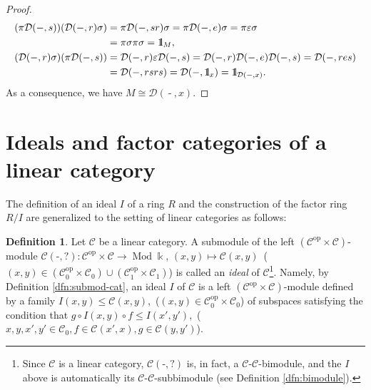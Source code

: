 \documentclass{surv-l}
\numberwithin{equation}{chapter}
\numberwithin{figure}{chapter}
\theoremstyle{plain}
\theoremstyle{definition}
\newtheorem{dfn}[thm]{Definition}
\theoremstyle{remark}
\newcommand{\id}{1\kern-.25em{\text{{\rm l}}}}
\DeclareMathOperator{\Mod}{Mod}
\DeclareMathOperator{\blank}{-}
\begin{document}
\begin{proof}
\[
\begin{aligned}
(\pi {\mathcal{D}}(\blank,s))({\mathcal{D}}(\blank, r) \sigma) &= \pi {\mathcal{D}}(\blank, sr) \sigma
= \pi {\mathcal{D}}(\blank, e) \sigma =\pi \varepsilon \sigma\\
&= \pi \sigma \pi \sigma = \id_M,\\
({\mathcal{D}}(\blank, r) \sigma)(\pi {\mathcal{D}}(\blank,s)) &= {\mathcal{D}}(\blank, r) \varepsilon {\mathcal{D}}(\blank,s)
= {\mathcal{D}}(\blank, r) {\mathcal{D}}(\blank, e) {\mathcal{D}}(\blank,s) = {\mathcal{D}}(\blank, res)\\
&={\mathcal{D}}(\blank, rsrs) = {\mathcal{D}}(\blank, \id_x) = \id_{{\mathcal{D}}(\blank, x)}.
\end{aligned}
\]
As a consequence, we have $M \cong {\mathcal{D}}(\blank, x)$.
\end{proof}

\section{Ideals and factor categories of a linear category}The definition of an ideal $I$ of a ring $R$ and the construction of
the factor ring $R/I$ are generalized to the setting of linear categories as follows:

\begin{dfn}
Let ${\mathcal{C}}$ be a linear category.
A submodule of the left
$({\mathcal{C}}^{\mathrm{op}} \times {\mathcal{C}})$-module
${\mathcal{C}}(\text{-},?) \colon {\mathcal{C}}^{\mathrm{op}} \times {\mathcal{C}} \to \Mod \Bbbk$,
$(x, y) \mapsto {\mathcal{C}}(x, y)$\ ($(x, y) \in ({\mathcal{C}}^{\mathrm{op}}_0 \times {\mathcal{C}}_0) \cup ({\mathcal{C}}^{\mathrm{op}}_1 \times {\mathcal{C}}_1)$)
is called an \emph{ideal} of ${\mathcal{C}}$\footnote{Since ${\mathcal{C}}$ is a linear category,
${\mathcal{C}}(\text{-}, ?)$ is, in fact, a ${\mathcal{C}}$-${\mathcal{C}}$-bimodule, and
the $I$ above is automatically its ${\mathcal{C}}$-${\mathcal{C}}$-subbimodule
(see Definition \ref{dfn:bimodule}).
}.
Namely, by Definition \ref{dfn:submod-cat},
an ideal $I$ of ${\mathcal{C}}$ is a left $({\mathcal{C}}^{\mathrm{op}} \times {\mathcal{C}})$-module
defined by a family $I(x, y) \le {\mathcal{C}}(x, y)$,\
($(x, y) \in {\mathcal{C}}^{\mathrm{op}}_0 \times {\mathcal{C}}_0$) of subspaces satisfying
the condition that $g \circ I(x, y) \circ f \le I(x', y')$,\
($x,y,x',y' \in {\mathcal{C}}_0, f \in {\mathcal{C}}(x', x), g \in {\mathcal{C}}(y, y')$).
\end{dfn}
\end{document}
